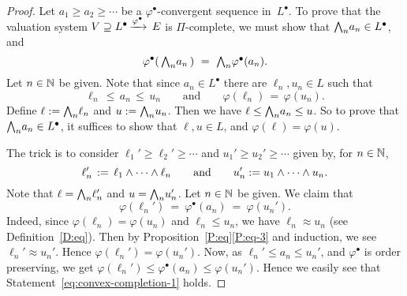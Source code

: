 \documentclass[main.tex]{subfiles}
\begin{document}
\begin{proof}
Let $a_1 \geq a_2 \geq \dotsb$
be a $\varphi^\bullet$-convergent sequence in~$L^\bullet$.
To prove that the valuation system
$V \supseteq L^\bullet\,\smash{\xrightarrow{\varphi^\bullet}\,E}$ is $\Pi$-complete,
we must show that $\textstyle{\bigwedge}_n a_n \in L^\bullet$,
and
\begin{equation*}
\varphi^\bullet(\,\textstyle{\bigwedge}_n a_n\,) \ =\  \textstyle{\bigwedge}_n \varphi^\bullet(a_n).
\end{equation*}
Let $n\in \mathbb{N}$ be given.
Note that since $a_n \in L^\bullet$
there are $\ell_n,u_n \in L$
such that 
\begin{equation*}
\ell_n \,\leq\, a_n \,\leq\, u_n
\qquad\text{and}\qquad
\varphi(\ell_n) \,=\, \varphi(u_n).
\end{equation*}
Define $\ell:= \textstyle{\bigwedge}_n \ell_n$
and $u:= \textstyle{\bigwedge}_n u_n$.
Then we have $\ell \leq \textstyle{\bigwedge}_n a_n \leq u$.
So to prove that $\textstyle{\bigwedge}_n a_n \in L^\bullet$,
it suffices to show that $\ell,u\in L$,
and $\varphi(\ell)=\varphi(u)$.

The trick is
to consider
$\ell_1' \geq \ell_2 '\geq \dotsb$
and $u_1'\geq u_2' \geq\dotsb$
given by, for $n\in\mathbb{N}$,
\begin{equation*}
\ell_n' \,:=\, \ell_1 \wedge \dotsb \wedge \ell_n
\qquad\text{and}\qquad
u_n':= u_1 \wedge \dotsb \wedge u_n.
\end{equation*}
Note that
$\ell= \textstyle{\bigwedge}_n \ell_n '$ and $u= \textstyle{\bigwedge}_n u_n '$.
Let $n\in \mathbb{N}$ be given.
We claim that
\begin{equation}
\label{eq:convex-completion-1}
\varphi(\ell_n') \ =\  \varphi^\bullet(a_n)\ =\ \varphi(u_n').
\end{equation}
Indeed, since $\varphi(\ell_n) = \varphi(u_n)$
and $\ell_n\leq u_n$,
we have $\ell_n \approx u_n$
(see Definition~\ref{D:eq}).
Then 
by  Proposition~\ref{P:eq}\ref{P:eq-3}
and induction, we see $\ell_n' \approx u_n'$.
Hence  $\varphi(\ell_n') = \varphi(u_n')$.
Now, as
$\ell_n'\leq a_n \leq u_n'$,
and $\varphi^\bullet$ is order preserving,
we get
 $\varphi(\ell_n') \leq \varphi^\bullet(a_n) \leq \varphi(u_n')$.
Hence we easily see that Statement~\eqref{eq:convex-completion-1} holds.


\end{proof}
\end{document}
